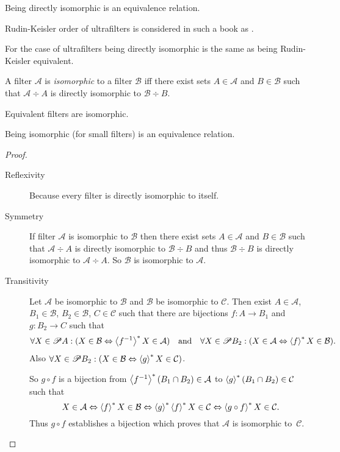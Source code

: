 \begin{cor}
Being directly isomorphic is an equivalence relation.
\end{cor}
Rudin-Keisler order of ultrafilters is
considered in such a book as \cite{comfort-ultra}.
\begin{obvious}
For the case of ultrafilters being directly isomorphic is the same
as being Rudin-Keisler equivalent.\end{obvious}
\begin{defn}
A filter $\mathcal{A}$ is \emph{isomorphic}
to a filter $\mathcal{B}$ iff there exist sets $A\in\mathcal{A}$
and $B\in\mathcal{B}$ such that $\mathcal{A}\div A$ is directly
isomorphic to $\mathcal{B}\div B$.\end{defn}
\begin{obvious}
Equivalent filters are isomorphic.\end{obvious}
\begin{thm}
Being isomorphic (for small filters) is an equivalence relation.\end{thm}
\begin{proof}
~
\begin{description}
\item [{Reflexivity}] Because every filter is directly isomorphic to itself.
\item [{Symmetry}] If filter $\mathcal{A}$ is isomorphic to $\mathcal{B}$
then there exist sets $A\in\mathcal{A}$ and $B\in\mathcal{B}$ such
that $\mathcal{A}\div A$ is directly isomorphic to $\mathcal{B}\div B$
and thus $\mathcal{B}\div B$ is directly isomorphic to $\mathcal{A}\div A$.
So $\mathcal{B}$ is isomorphic to $\mathcal{A}$.
\item [{Transitivity}] Let $\mathcal{A}$ be isomorphic to $\mathcal{B}$
and $\mathcal{B}$ be isomorphic to $\mathcal{C}$. Then exist $A\in\mathcal{A}$,
$B_{1}\in\mathcal{B}$, $B_{2}\in\mathcal{B}$, $C\in\mathcal{C}$
such that there are bijections $f:A\rightarrow B_{1}$ and $g:B_{2}\rightarrow C$
such that
\[
\forall X\in\mathscr{P} A:(X\in\mathcal{B}\Leftrightarrow\left\langle f^{-1}\right\rangle ^{\ast}X\in\mathcal{A})\quad\text{and}\quad\forall X\in\mathscr{P} B_{2}:(X\in\mathcal{A}\Leftrightarrow\left\langle f\right\rangle ^{\ast}X\in\mathcal{B}).
\]
Also $\forall X\in\mathscr{P} B_{2}:(X\in\mathcal{B}\Leftrightarrow\left\langle g\right\rangle ^{\ast}X\in\mathcal{C})$.


So $g\circ f$ is a bijection from $\left\langle f^{-1}\right\rangle ^{\ast}(B_{1}\cap B_{2})\in\mathcal{A}$
to $\left\langle g\right\rangle ^{\ast}(B_{1}\cap B_{2})\in\mathcal{C}$ such that
\[
X\in\mathcal{A}\Leftrightarrow\left\langle f\right\rangle ^{\ast}X\in\mathcal{B}\Leftrightarrow\left\langle g\right\rangle ^{\ast}\left\langle f\right\rangle ^{\ast}X\in\mathcal{C}\Leftrightarrow\left\langle g\circ f\right\rangle ^{\ast}X\in\mathcal{C}.
\]
Thus $g\circ f$ establishes a bijection which proves that $\mathcal{A}$
is isomorphic to~$\mathcal{C}$.

\end{description}
\end{proof}
